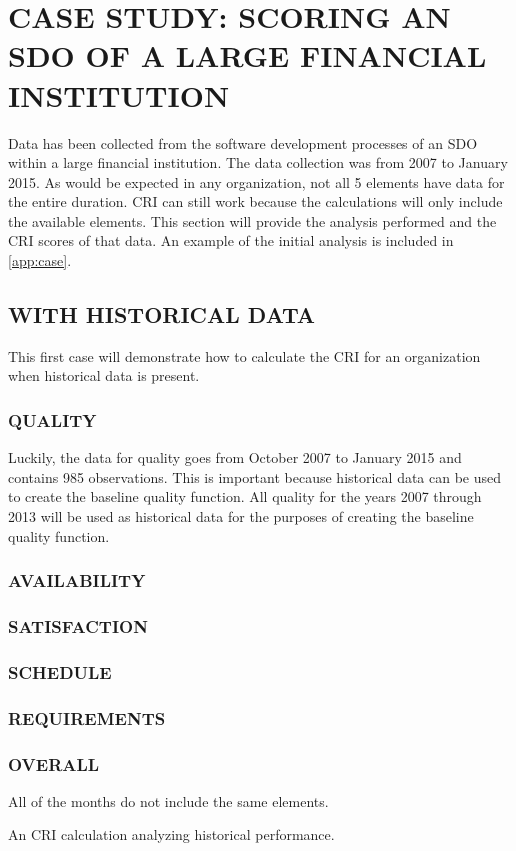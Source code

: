 \documentclass[SDSUThesis.tex]{subfiles}
\begin{document}
\section{CASE STUDY: SCORING AN SDO OF A LARGE FINANCIAL INSTITUTION}

Data has been collected from the software development processes of
an SDO within a large financial institution.
The data collection was from 2007 to January 2015. As would be expected
in any organization, not all 5 elements have data for the entire duration.
CRI can still work because the calculations will only include
the available elements.  This section will provide the analysis performed and the CRI scores of that data.  An example of the initial analysis is included in \cref{app:case}.

\subsection{WITH HISTORICAL DATA}
    This first case will demonstrate how to calculate the CRI for an
    organization when historical data is present.  
    \subsubsection{QUALITY}
        Luckily, the data for quality goes from October 2007 to January 2015
        and contains 985 observations.
        This is important because historical data can be used to create the
        baseline quality function.  All quality for the years 2007 through 2013
        will be used as historical data for the purposes of creating
        the baseline quality function.  
    \subsubsection{AVAILABILITY}
    \subsubsection{SATISFACTION}
    \subsubsection{SCHEDULE}
    \subsubsection{REQUIREMENTS}
    \subsubsection{OVERALL}
        All of the months do not include the same elements.  

An CRI calculation analyzing historical performance.


\end{document}
